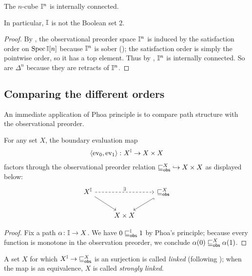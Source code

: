 \begin{corollary}[\AxiomNT, \AxiomSQCP]\label{cor:cubes-internally-connected}
  The $n$-cube $\mathbb{I}^n$ is internally connected.
\end{corollary}

In particular, $\mathbb{I}$ is not the Boolean set $2$.

\begin{proof}
   By , the observational preorder space $\mathbb{I}^n$ is induced by the satisfaction order on $\operatorname{Spec}\mathbb{I}[n]$ because $\mathbb{I}^n$ is sober (); the satisfaction order is simply the pointwise order, so it has a top element. Thus by , $\mathbb{I}^n$ is internally connected. So are $\Delta^n$ because they are retracts of $\mathbb{I}^n$.
\end{proof}

\subsection{Comparing the different orders}

An immediate application of Phoa principle is to compare path structure with the observational preorder.

\begin{observation}[\AxiomSQCP]
  For any set $X$, the boundary evaluation map 
  \[ \left\langle\mathrm{ev}_0,\mathrm{ev}_1\right\rangle\colon X^{\mathbb{I}}\to X\times X \] 
  factors through the observational preorder relation ${\obsle[X]}\hook X\times X$ as displayed below:
  \[ 
    \begin{tikzcd}
      X^\mbb{I} 
        \arrow[rr,densely dashed, "\exists"]
        \arrow[dr]
      && 
      {\obsle[X]}
        \arrow[dl,hookrightarrow]
      \\ 
      &
      X\times X
    \end{tikzcd}
  \] 
\end{observation}
\begin{proof}
  Fix a path $\alpha\colon \mathbb{I}\to X$. We have $0\obsle[\mbb{I}] 1$ by Phoa's principle; because every function is monotone in the observation preorder, we conclude $\alpha(0)\obsle[X] \alpha(1)$.
\end{proof}

\begin{definition}
  A set $X$ for which $X^\mbb{I}\to {\obsle[X]}$ is an surjection is called \emph{linked} (following \citet{PhoaWesleyKym-Son1991DtiR}); when the map is an equivalence, $X$ is called \emph{strongly linked}.
\end{definition}

